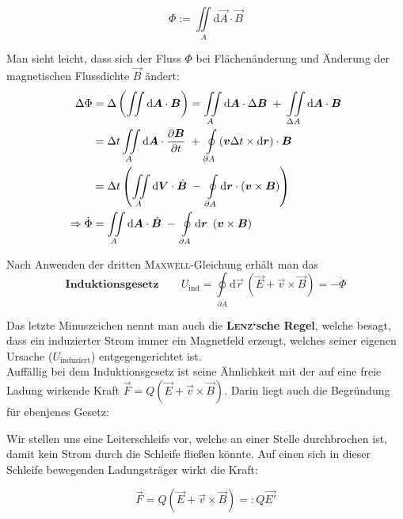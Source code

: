 \begin{equation*}
\Phi := \iint\limits_A\mathrm{d}\vec{A}\cdot\vec{B}
\end{equation*}

Man sieht leicht, dass sich der Fluss $\Phi$ bei Flächenänderung und Änderung der magnetischen Flussdichte $\vec{B}$ ändert:\\


\begin{align*}
\Delta\Phi &=  \Delta\left(\iint\mathrm{d}\vec{A}\cdot\vec{B}\right) = \iint\limits_A\mathrm{d}\vec{A}\cdot\Delta\vec{B} \; + \; \iint\limits_{\Delta A}\mathrm{d}\vec{A}\cdot\vec{B}\\
&= \Delta t \iint\limits_A\mathrm{d}\vec{A}\cdot\pdiff{\vec{B}}{t} \; + \; \oint\limits_{\partial A}\left(\vec{v}\Delta t\times\mathrm{d}\vec{r}\right)\cdot\vec{B}\\
&= \Delta t\left(\iint\limits_A\mathrm{d}\vec{V}\cdot\dot{\vec{B}} \; - \; \oint\limits_{\partial A}\mathrm{d}\vec{r}\cdot\left(\vec{v}\times\vec{B}\right)\right)\\
\Rightarrow \dot{\Phi} &= \iint\limits_A\mathrm{d}\vec{A}\cdot\dot{\vec{B}} \; - \; \oint\limits_{\partial A}\mathrm{d}\vec{r} \ \left(\vec{v}\times\vec{B}\right)
\end{align*}

Nach Anwenden der dritten \textsc{Maxwell}-Gleichung erhält man das
\begin{equation*}\textbf{Induktionsgesetz}\qquad
U_\text{ind} =  \oint\limits_{\partial A}\mathrm{d}\vec{r} \ \left(\vec{E} + \vec{v}\times\vec{B}\right) = - \dot{\Phi}
\end{equation*}

Das letzte Minuszeichen nennt man auch die \textbf{\textsc{Lenz}`sche Regel}, welche besagt, dass ein induzierter Strom immer ein Magnetfeld erzeugt, welches seiner eigenen Ursache ($U_{\mathrm{induziert}}$) entgegengerichtet ist.
\ \\
Auffällig bei dem Induktionsgesetz ist seine Ähnlichkeit mit der auf eine freie Ladung wirkende Kraft $\vec{F} = Q(\vec{E} + \vec{v}\times\vec{B})$. Darin liegt auch die Begründung für ebenjenes Gesetz:\

Wir stellen uns eine Leiterschleife vor, welche an einer Stelle durchbrochen ist, damit kein Strom durch die Schleife fließen könnte. Auf einen sich in dieser Schleife bewegenden Ladungsträger wirkt die Kraft:

\begin{equation*}
\vec{F} = Q(\vec{E} + \vec{v}\times\vec{B}) =: Q\vec{E'}
\end{equation*} 

